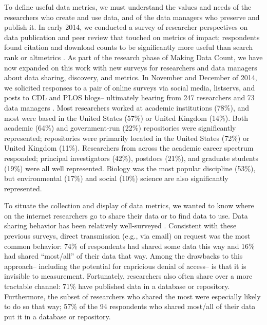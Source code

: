 \documentclass[english]{article}
\begin{document}

To define useful data metrics, we must understand the values and needs of the researchers who create and use data, and of the data managers who preserve and publish it.
In early 2014, we conducted a survey of researcher perspectives on data publication and peer review that touched on metrics of impact; respondents found citation and download counts to be significantly more useful than search rank or altmetrics \cite{kratz_researcher_2015}.
As part of the research phase of Making Data Count, we have now expanded on this work with new surveys for researchers and data managers about data sharing, discovery, and metrics.
In November and December of 2014, we solicited responses to a pair of online surveys via social media, listservs, and posts to CDL and PLOS blogs-- ultimately hearing from 247 researchers and 73 data managers \cite{kratz_making_2015}.
Most researchers worked at academic institutions (78\%), and most were based in the United States (57\%) or United Kingdom (14\%).
Both academic (64\%) and government-run (22\%) repositories were significantly represented; repositories were primarily located in the United States (72\%) or United Kingdom (11\%).
Researchers from across the academic career spectrum responded; principal investigators (42\%), postdocs (21\%), and graduate students (19\%) were all well represented. 
Biology was the most popular discipline (53\%), but environmental (17\%) and social (10\%) science are also significantly represented. 



To situate the collection and display of data metrics, we wanted to know where on the internet researchers go to share their data or to find data to use. 
Data sharing behavior has been relatively well-surveyed \cite{tenopir_data_2011, akers_disciplinary_2013, wallis_if_2013, aydinoglu_data_2014, kratz_researcher_2015}. 
Consistent with these previous surveys, direct transmission (e.g., via email) on request was the most common behavior: 74\% of respondents had shared some data this way and 16\% had shared ``most/all'' of their data that way.
Among the drawbacks to this approach-- including the potential for capricious denial of access-- is that it is invisible to measurement. 
Fortunately, researchers also often share over a more tractable channel: 71\% have published data in a database or repository.
Furthermore, the subset of researchers who shared the most were especially likely to do so that way; 57\% of the 94 respondents who shared most/all of their data put it in a database or repository.
\end{document}
